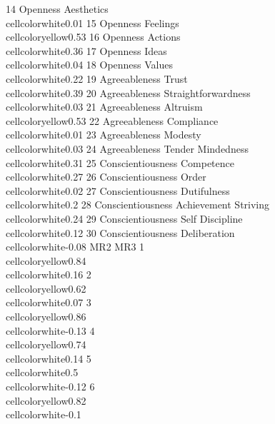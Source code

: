 \documentclass{article}\usepackage[]{graphicx}\usepackage[]{color}
\begin{document}
14          Openness           Aesthetics  \\cellcolor{white}{0.01}
15          Openness             Feelings \\cellcolor{yellow}{0.53}
16          Openness              Actions  \\cellcolor{white}{0.36}
17          Openness                Ideas  \\cellcolor{white}{0.04}
18          Openness               Values  \\cellcolor{white}{0.22}
19     Agreeableness                Trust  \\cellcolor{white}{0.39}
20     Agreeableness  Straightforwardness  \\cellcolor{white}{0.03}
21     Agreeableness             Altruism \\cellcolor{yellow}{0.53}
22     Agreeableness           Compliance  \\cellcolor{white}{0.01}
23     Agreeableness              Modesty  \\cellcolor{white}{0.03}
24     Agreeableness    Tender Mindedness  \\cellcolor{white}{0.31}
25 Conscientiousness           Competence  \\cellcolor{white}{0.27}
26 Conscientiousness                Order  \\cellcolor{white}{0.02}
27 Conscientiousness          Dutifulness   \\cellcolor{white}{0.2}
28 Conscientiousness Achievement Striving  \\cellcolor{white}{0.24}
29 Conscientiousness      Self Discipline  \\cellcolor{white}{0.12}
30 Conscientiousness         Deliberation \\cellcolor{white}{-0.08}
                         MR2                       MR3
1  \\cellcolor{yellow}{0.84}  \\cellcolor{white}{0.16}
2  \\cellcolor{yellow}{0.62}  \\cellcolor{white}{0.07}
3  \\cellcolor{yellow}{0.86} \\cellcolor{white}{-0.13}
4  \\cellcolor{yellow}{0.74}  \\cellcolor{white}{0.14}
5    \\cellcolor{white}{0.5} \\cellcolor{white}{-0.12}
6  \\cellcolor{yellow}{0.82}  \\cellcolor{white}{-0.1}
\end{document}

